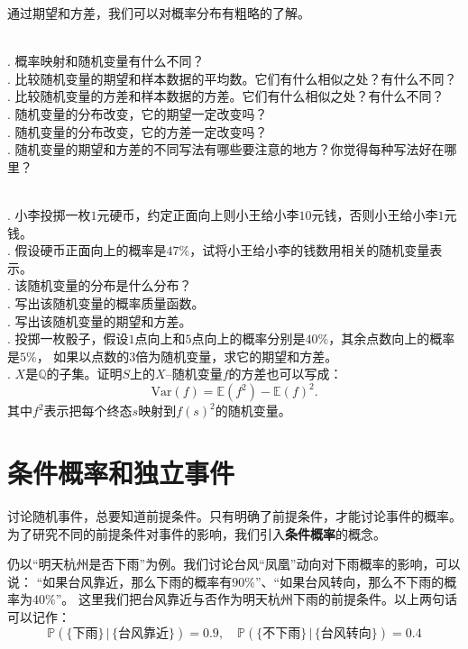 \documentclass[12pt,UTF8,fontset=none]{ctexbook}
\begin{document}
通过期望和方差，我们可以对概率分布有粗略的了解。

\begin{sk}
    \mbox{} \\
    . 概率映射和随机变量有什么不同？ \\
    . 比较随机变量的期望和样本数据的平均数。它们有什么相似之处？有什么不同？\\
    . 比较随机变量的方差和样本数据的方差。它们有什么相似之处？有什么不同？\\
    . 随机变量的分布改变，它的期望一定改变吗？\\
    . 随机变量的分布改变，它的方差一定改变吗？ \\
    . 随机变量的期望和方差的不同写法有哪些要注意的地方？你觉得每种写法好在哪里？   
\end{sk}

\begin{xt}
    \mbox{} \\
    . 小李投掷一枚$1$元硬币，约定正面向上则小王给小李$10$元钱，否则小王给小李$1$元钱。\\
    . 假设硬币正面向上的概率是$47\%$，试将小王给小李的钱数用相关的随机变量表示。\\
    . 该随机变量的分布是什么分布？    \\
    . 写出该随机变量的概率质量函数。\\
    . 写出该随机变量的期望和方差。\\
    . 投掷一枚骰子，假设$1$点向上和$5$点向上的概率分别是$40\%$，其余点数向上的概率是$5\%$，
    如果以点数的$3$倍为随机变量，求它的期望和方差。\\
    . $X$是$\mathbb{Q}$的子集。证明$S$上的$X$–随机变量$f$的方差也可以写成：
    $$ \mathrm{Var}(f)  = \mathbb{E}(f^2) - \mathbb{E}(f)^2.$$  
    \indent \hspace{1em}  其中$f^2$表示把每个终态$s$映射到$f(s)^2$的随机变量。
\end{xt}

\section{条件概率和独立事件}
讨论随机事件，总要知道前提条件。只有明确了前提条件，才能讨论事件的概率。
为了研究不同的前提条件对事件的影响，我们引入\textbf{条件概率}的概念。

仍以“明天杭州是否下雨”为例。我们讨论台风“凤凰”动向对下雨概率的影响，可以说：
“如果台风靠近，那么下雨的概率有$90\%$”、“如果台风转向，那么不下雨的概率为$40\%$”。
这里我们把台风靠近与否作为明天杭州下雨的前提条件。以上两句话可以记作：
$$ \mathbb{P} (\{\mbox{下雨}\} \, | \, \{\mbox{台风靠近}\}) = 0.9, \quad \mathbb{P} (\{\mbox{不下雨}\} \, | \, \{\mbox{台风转向}\}) = 0.4$$
\end{document}
